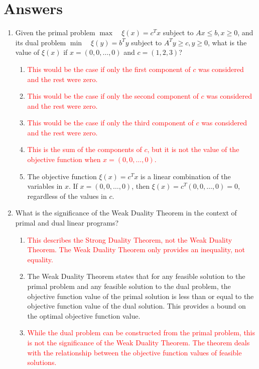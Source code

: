 \documentclass{article}%
\newcommand{\incorrect}[1]{\textcolor{red}{#1}}
\begin{document}
\section{Answers}%
\label{sec:Answers}%
\begin{enumerate}%
\item Given the primal problem $\max \quad \xi(x) = c^T x$ subject to $Ax \leq b, x \geq 0$, and its dual problem $\min \quad \xi(y) = b^T y$ subject to $A^T y \geq c, y \geq 0$, what is the value of $\xi(x)$ if $x = (0, 0, \dots, 0)$ and $c = (1, 2, 3)$?%
\begin{enumerate}%
\item \incorrect{This would be the case if only the first component of $c$ was considered and the rest were zero.}%
\item \incorrect{This would be the case if only the second component of $c$ was considered and the rest were zero.}%
\item \incorrect{This would be the case if only the third component of $c$ was considered and the rest were zero.}%
\item \incorrect{This is the sum of the components of $c$, but it is not the value of the objective function when $x = (0, 0, \dots, 0)$.}%
\item The objective function $\xi(x) = c^T x$ is a linear combination of the variables in $x$. If $x = (0, 0, \dots, 0)$, then $\xi(x) = c^T (0, 0, \dots, 0) = 0$, regardless of the values in $c$.%
\end{enumerate}%
\vspace{1em}%
\item What is the significance of the Weak Duality Theorem in the context of primal and dual linear programs?%
\begin{enumerate}%
\item \incorrect{This describes the Strong Duality Theorem, not the Weak Duality Theorem. The Weak Duality Theorem only provides an inequality, not equality.}%
\item The Weak Duality Theorem states that for any feasible solution to the primal problem and any feasible solution to the dual problem, the objective function value of the primal solution is less than or equal to the objective function value of the dual solution. This provides a bound on the optimal objective function value.%
\item \incorrect{While the dual problem can be constructed from the primal problem, this is not the significance of the Weak Duality Theorem. The theorem deals with the relationship between the objective function values of feasible solutions.}%

\end{enumerate}
\end{enumerate}
\end{document}
